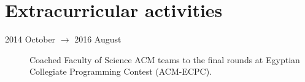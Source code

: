\documentclass[margin,line,a4paper]{resume}
\begin{document}
\begin{resume}
\begin{description}
\end{description}

%


\section{\mysidestyle Extracurricular activities}\vspace{1mm}
    \begin{description}
    \item[2014 October $\rightarrow$ 2016 August] Coached Faculty of Science ACM teams to the final rounds at Egyptian Collegiate Programming Contest (ACM-ECPC).
    
    
    
    \end{description}




\end{resume}
\end{document}
